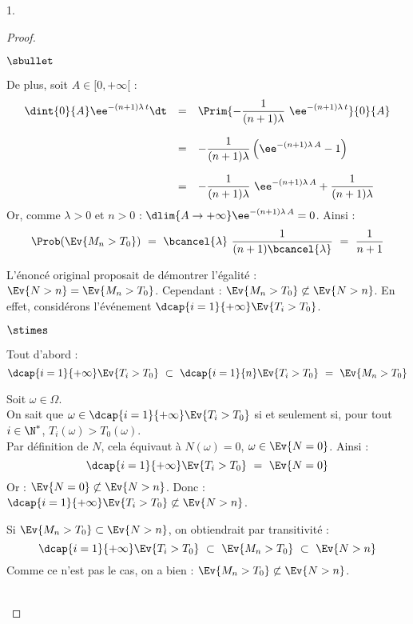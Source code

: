 \documentclass[11pt]{article}%
\begin{document}
\begin{noliste}{1.}
\begin{proof}
\begin{noliste}{$\sbullet$}
      \item De plus, soit $A \in [0,+\infty[$ :
        \[
          \begin{array}{rcl}
            \dint{0}{A} \ee^{-(n+1) \lambda \, t} \dt
            & = & \Prim{- \dfrac{1}{(n+1) \lambda} \ \ee^{-(n+1)
                  \lambda  \, t}}{0}{A}
            \\[.6cm]
            & = & -\dfrac{1}{(n+1) \lambda} \left(\ee^{-(n+1) \lambda
                  \, A}  - 1\right)
            \\[.6cm]
            & = & -\dfrac{1}{(n+1) \lambda} \ \ee^{-(n+1) \lambda \, A}
                  + \dfrac{1}{(n+1) \lambda}
          \end{array}
        \]
        Or, comme $\lambda >0$ et $n>0$ : $\dlim{A \to + \infty}
        \ee^{-(n+1) \lambda \, A} = 0$. Ainsi :
        \[
          \Prob(\Ev{M_n > T_0}) \ = \ \bcancel{\lambda} \
          \dfrac{1}{(n+1) \bcancel{\lambda}} \ = \ \dfrac{1}{n+1}
        \]
      \end{noliste}
      \begin{remark}
        L'énoncé original proposait de démontrer l'égalité : $\Ev{N >
          n} = \Ev{M_n > T_0}$. Cependant : $\Ev{M_n > T_0}
        \not\subset \Ev{N > n}$. En effet, considérons
        l'événement $\dcap{i=1}{+\infty} \Ev{T_i > T_0}$.
        \begin{noliste}{$\stimes$}
        \item Tout d'abord :
          \[
            \dcap{i=1}{+\infty} \Ev{T_i > T_0} \ \subset \
            \dcap{i=1}{n} \Ev{T_i > T_0} \ = \ \Ev{M_n > T_0}
          \]
          
        \item Soit $\omega \in \Omega$.\\
          On sait que $\omega \in \dcap{i=1}{+\infty} \Ev{T_i
            > T_0}$ si et seulement si, pour tout $i \in \N^*$, $T_i(\omega) >
          T_0(\omega)$.\\
          Par définition de $N$, cela équivaut à
          $N(\omega) = 0$, \ie $\omega \in \Ev{N = 0}$. Ainsi :
          \[
            \dcap{i=1}{+\infty} \Ev{T_i > T_0} \ = \ \Ev{N = 0}
          \]
          Or : $\Ev{N = 0} \not\subset \Ev{N > n}$. Donc :
          $\dcap{i=1}{+\infty} \Ev{T_i > T_0} \not\subset \Ev{N > n}$.
          
        \item Si $\Ev{M_n > T_0} \subset \Ev{N > n}$, on obtiendrait
          par transitivité :
          \[
            \dcap{i=1}{+\infty} \Ev{T_i > T_0} \ \subset \ \Ev{M_n >
              T_0} \ \subset \ \Ev{N >n}
          \]
          Comme ce n'est pas le cas, on a bien : $\Ev{M_n > T_0}
          \not\subset \Ev{N > n}$.
        \end{noliste}
      \end{remark}~\\[-1.4cm]
    \end{proof}


\end{noliste}
\end{document}
